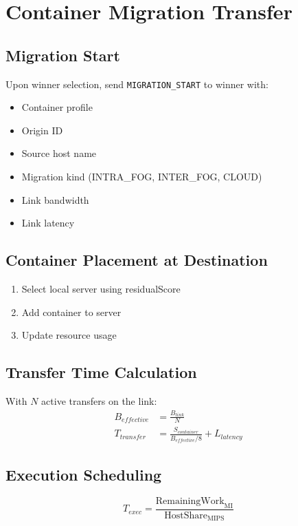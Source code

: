 \documentclass[12pt,a4paper]{article}
\begin{document}
\section{Container Migration Transfer}

\subsection{Migration Start}

Upon winner selection, send \texttt{MIGRATION\_START} to winner with:
\begin{itemize}
    \item Container profile
    \item Origin ID
    \item Source host name
    \item Migration kind (INTRA\_FOG, INTER\_FOG, CLOUD)
    \item Link bandwidth
    \item Link latency
\end{itemize}

\subsection{Container Placement at Destination}

\begin{enumerate}
    \item Select local server using residualScore
    \item Add container to server
    \item Update resource usage
\end{enumerate}

\subsection{Transfer Time Calculation}

With $N$ active transfers on the link:
\begin{align}
    B_{effective} &= \frac{B_{link}}{N} \\
    T_{transfer} &= \frac{S_{container}}{B_{effective}/8} + L_{latency}
\end{align}

\subsection{Execution Scheduling}

\begin{equation}
    T_{exec} = \frac{\text{RemainingWork}_{\text{MI}}}{\text{HostShare}_{\text{MIPS}}}
\end{equation}
\end{document}
